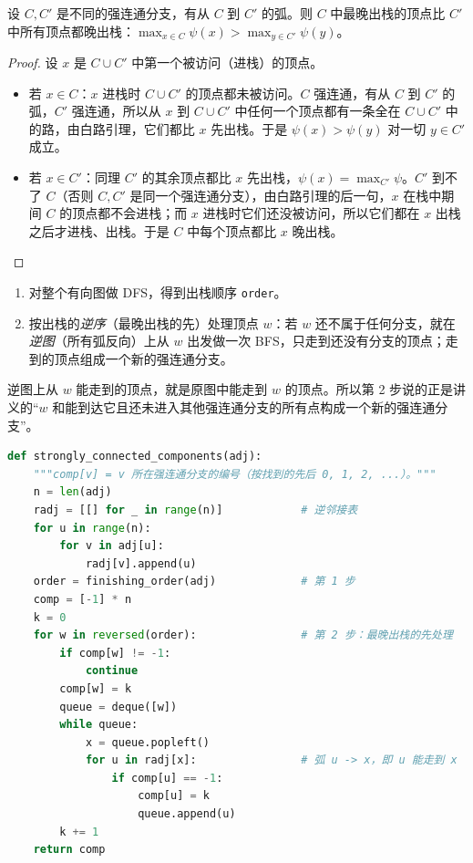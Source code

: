 \begin{lemma}\label{lem:digraph-orders:finish}
设 $C,C'$ 是不同的强连通分支，有从 $C$ 到 $C'$ 的弧。则 $C$ 中最晚出栈的顶点比 $C'$ 中所有顶点都晚出栈：$\max_{x\in C}\psi(x)>\max_{y\in C'}\psi(y)$。
\end{lemma}
\begin{proof}
设 $x$ 是 $C\cup C'$ 中第一个被访问（进栈）的顶点。
\begin{itemize}
\item 若 $x\in C$：$x$ 进栈时 $C\cup C'$ 的顶点都未被访问。$C$ 强连通，有从 $C$ 到 $C'$ 的弧，$C'$ 强连通，所以从 $x$ 到 $C\cup C'$ 中任何一个顶点都有一条全在 $C\cup C'$ 中的路，由白路引理，它们都比 $x$ 先出栈。于是 $\psi(x)>\psi(y)$ 对一切 $y\in C'$ 成立。
\item 若 $x\in C'$：同理 $C'$ 的其余顶点都比 $x$ 先出栈，$\psi(x)=\max_{C'}\psi$。$C'$ 到不了 $C$（否则 $C,C'$ 是同一个强连通分支），由白路引理的后一句，$x$ 在栈中期间 $C$ 的顶点都不会进栈；而 $x$ 进栈时它们还没被访问，所以它们都在 $x$ 出栈之后才进栈、出栈。于是 $C$ 中每个顶点都比 $x$ 晚出栈。\qedhere
\end{itemize}
\end{proof}


\begin{enumerate}
\item 对整个有向图做 DFS，得到出栈顺序 \texttt{order}。
\item 按出栈的\emph{逆序}（最晚出栈的先）处理顶点 $w$：若 $w$ 还不属于任何分支，就在\emph{逆图}（所有弧反向）上从 $w$ 出发做一次 BFS，只走到还没有分支的顶点；走到的顶点组成一个新的强连通分支。
\end{enumerate}

逆图上从 $w$ 能走到的顶点，就是原图中能走到 $w$ 的顶点。所以第 2 步说的正是讲义的“$w$ 和能到达它且还未进入其他强连通分支的所有点构成一个新的强连通分支”。

\begin{lstlisting}[language=Python]
def strongly_connected_components(adj):
    """comp[v] = v 所在强连通分支的编号（按找到的先后 0, 1, 2, ...）。"""
    n = len(adj)
    radj = [[] for _ in range(n)]            # 逆邻接表
    for u in range(n):
        for v in adj[u]:
            radj[v].append(u)
    order = finishing_order(adj)             # 第 1 步
    comp = [-1] * n
    k = 0
    for w in reversed(order):                # 第 2 步：最晚出栈的先处理
        if comp[w] != -1:
            continue
        comp[w] = k
        queue = deque([w])
        while queue:
            x = queue.popleft()
            for u in radj[x]:                # 弧 u -> x，即 u 能走到 x
                if comp[u] == -1:
                    comp[u] = k
                    queue.append(u)
        k += 1
    return comp
\end{lstlisting}

